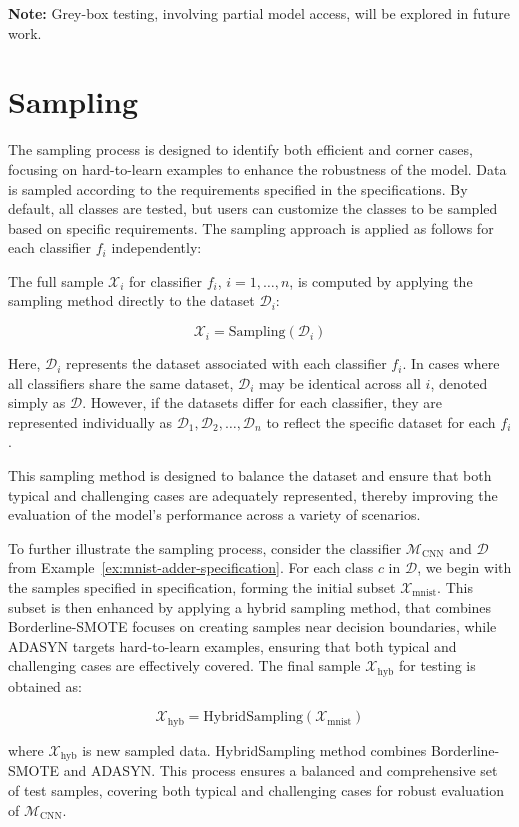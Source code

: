 \textbf{Note:} Grey-box testing, involving partial model access, will be explored in future work.
\section{Sampling}
The sampling process is designed to identify both efficient and corner cases, focusing on hard-to-learn examples to enhance the robustness of the model. Data is sampled according to the requirements specified in the specifications. By default, all classes are tested, but users can customize the classes to be sampled based on specific requirements. The sampling approach is applied as follows for each classifier $f_i$ independently:

The full sample $\mathcal{X}_i$ for classifier $f_i$, $i=1,\dots,n$, is computed by applying the sampling method directly to the dataset $\mathcal{D}_i$:

\begin{equation}
\mathcal{X}_i = \text{Sampling}(\mathcal{D}_i)
\end{equation}

Here, $\mathcal{D}_i$ represents the dataset associated with each classifier $f_i$. In cases where all classifiers share the same dataset, $\mathcal{D}_i$ may be identical across all $i$, denoted simply as $\mathcal{D}$. However, if the datasets differ for each classifier, they are represented individually as $\mathcal{D}_1, \mathcal{D}_2, \dots, \mathcal{D}_n$ to reflect the specific dataset for each $f_i$.



This sampling method is designed to balance the dataset and ensure that both typical and challenging cases are adequately represented, thereby improving the evaluation of the model's performance across a variety of scenarios.


\begin{example}
  \label{ex:sampling}
  To further illustrate the sampling process, consider the classifier $\mathcal{M}_{\text{CNN}}$ and $\mathcal{D}$ from Example~\ref{ex:mnist-adder-specification}. For each class $c$ in $\mathcal{D}$, we begin with the samples specified in specification, forming the initial subset $\mathcal{X}_{\text{mnist}}$. This subset is then enhanced by applying a hybrid sampling method, that combines Borderline-SMOTE focuses on creating samples near decision boundaries, while ADASYN targets hard-to-learn examples, ensuring that both typical and challenging cases are effectively covered. The final sample $\mathcal{X}_{\text{hyb}}$ for testing is obtained as:
  

  \begin{equation}
    \mathcal{X}_{\text{hyb}} = \text{HybridSampling}(\mathcal{X}_{\text{mnist}})
  \end{equation}

  where $\mathcal{X}_{\text{hyb}}$ is new sampled data. HybridSampling method combines Borderline-SMOTE and ADASYN. This process ensures a balanced and comprehensive set of test samples, covering both typical and challenging cases for robust evaluation of $\mathcal{M}_{\text{CNN}}$.
\end{example}




